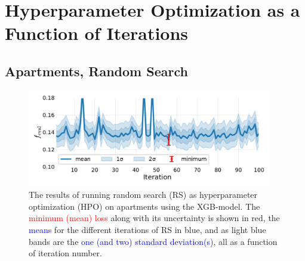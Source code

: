 \FloatBarrier
\section{Hyperparameter Optimization as a Function of Iterations}


\subsection*{Apartments, Random Search}
\begin{figure}
  \centerfloat
  \includegraphics[width=0.95\textwidth, trim=10 20 10 10, clip]{figures/housing/Ejerlejlighed_v19_cut_all_Ncols_all_xgb_score_over_time_random.pdf}
  \caption[Random Search Results as a Function of Iteration for Apartments]
          {The results of running random search (RS) as hyperparameter optimization (HPO) on apartments using the XGB-model. The \textcolor{red}{minimum (mean) loss} along with its uncertainty is shown in red, the \textcolor{blue}{means} for the different iterations of RS in blue, and as light blue bands are the \textcolor{blue}{one (and two) standard deviation(s)}, all as a function of iteration number.} 
\end{figure}
\vspace{3cm}
\FloatBarrier
